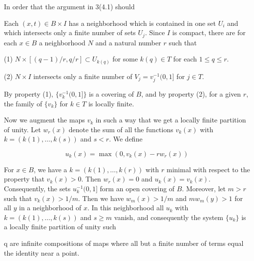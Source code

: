 In order that the argument in 3(4.1) should

Each $(x, t) \in B \times I$ has a neighborhood which is contained in one set $U_i$ and which intersects only a finite number of sets $U_j$. Since $I$ is compact, there are for each $x \in B$ a neighborhood $N$ and a natural number $r$ such that

(1) $N \times [(q - 1)/r, q/r] \subset U_{k(q)}$ for some $k(q) \in T$ for each $1 \leq q \leq r$.

(2) $N \times I$ intersects only a finite number of $V_j = v_j^{-1}(0, 1]$ for $j \in T$.

By property (1), $\{v_k^{-1}(0, 1]\}$ is a covering of $B$, and by property (2), for a given $r$, the family of $\{v_k\}$ for $k \in T$ is locally finite.

Now we augment the maps $v_k$ in such a way that we get a locally finite partition of unity. Let $w_r(x)$ denote the sum of all the functions $v_k(x)$ with $k = (k(1), \ldots, k(s))$ and $s < r$. We define

$$u_k(x) = \max(0, v_k(x) - rw_r(x))$$

For $x \in B$, we have a $k = (k(1), \ldots, k(r))$ with $r$ minimal with respect to the property that $v_k(x) > 0$. Then $w_r(x) = 0$ and $u_k(x) = v_k(x)$. Consequently, the sets $u_k^{-1}(0, 1]$ form an open covering of $B$. Moreover, let $m > r$ such that $v_k(x) > 1/m$. Then we have $w_m(x) > 1/m$ and $mw_m(y) > 1$ for all $y$ in a neighborhood of $x$. In this neighborhood all $u_k$ with $k = (k(1), \ldots, k(s))$ and $s \geq m$ vanish, and consequently the system $\{u_k\}$ is a locally finite partition of unity such

q are infinite compositions of maps where all but a finite number of terms equal the identity near a point.
